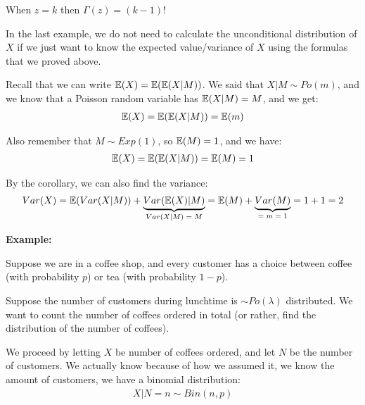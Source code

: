 \noindent When $z = k$ then $\Gamma(z) = (k-1)!$
\par\bigskip
\noindent In the last example, we do not need to calculate the unconditional distribution of $X$ if we just want to know the expected value/variance of $X$ using the formulas that we proved above.
\par\bigskip
\noindent Recall that we can write $\mathbb{E}(X) = \mathbb{E}(\mathbb{E}(X|M))$. We said that $X|M\sim Po(m)$, and we know that a Poisson random variable has $\mathbb{E}(X|M) = M$, and we get:
\begin{equation*}
  \begin{gathered}
    \mathbb{E}(X) = \mathbb{E}(\mathbb{E}(X|M)) = \mathbb{E}(m)
  \end{gathered}
\end{equation*}\par
\noindent Also remember that $M\sim Exp(1)$, so $\mathbb{E}(M) = 1$, and we have:
\begin{equation*}
  \begin{gathered}
    \mathbb{E}(X) = \mathbb{E}(\mathbb{E}(X|M)) = \mathbb{E}(M) = 1
  \end{gathered}
\end{equation*}\par
\noindent By the corollary, we can also find the variance:
\begin{equation*}
  \begin{gathered}
    Var(X) = \mathbb{E}(Var(X|M))+\underbrace{Var(\mathbb{E}(X)|M)}_{\text{$Var(X|M) = M$}} = \mathbb{E}(M)+\underbrace{Var(M)}_{\text{$=m=1$}} = 1+1 = 2
  \end{gathered}
\end{equation*}
\par\bigskip
\noindent\textbf{Example:}\par
\noindent Suppose we are in a coffee shop, and every customer has a choice between coffee (with probability $p$) or tea (with probability $1-p$).\par
\noindent Suppose the number of customers during lunchtime is $\sim Po(\lambda)$ distributed. We want to count the number of coffees ordered in total (or rather, find the distribution of the number of coffees).
\par\bigskip
\noindent We proceed by letting $X$ be number of coffees ordered, and let $N$ be the number of customers. We actually know because of how we assumed it, we know the amount of customers, we have a binomial distribution:
\begin{equation*}
  \begin{gathered}
    X|N=n\sim Bin(n,p)
  \end{gathered}
\end{equation*}
